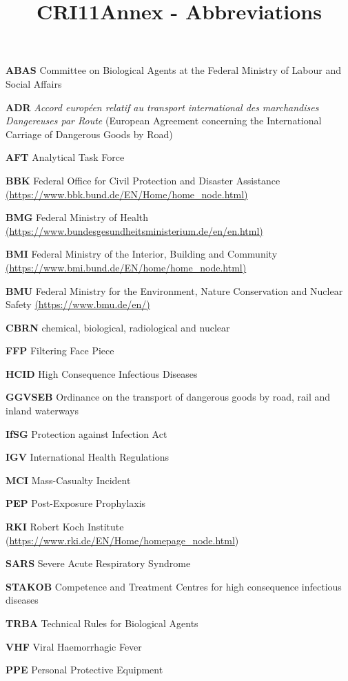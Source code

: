 \documentclass{article}
\begin{document}
\title{CRI11Annex - Abbreviations}

\maketitle





\textbf{ABAS }Committee on Biological Agents at the Federal Ministry of Labour and Social Affairs


\textbf{ADR }\emph{Accord européen relatif au transport international des}\emph{\textbf{ }}\emph{marchandises Dangereuses par Route} (European Agreement concerning the International Carriage of Dangerous Goods by Road)


\textbf{AFT }Analytical Task Force


\textbf{BBK }Federal Office for Civil Protection and Disaster Assistance\textbf{ }\href{https://www.bbk.bund.de/EN/Home/home_node.html}{(https://www.bbk.bund.de/EN/Home/home\_node.html)}


\textbf{BMG }Federal Ministry of Health\textbf{ }\href{https://www.bundesgesundheitsministerium.de/en/en.html}{(https://www.bundesgesundheitsministerium.de/en/en.html)}


\textbf{BMI }Federal Ministry of the Interior, Building and Community\textbf{ }\href{https://www.bmi.bund.de/EN/home/home_node.html}{(https://www.bmi.bund.de/EN/home/home\_node.html)} 


\textbf{BMU }Federal Ministry for the Environment, Nature Conservation and Nuclear\textbf{ }Safety \href{https://www.bmu.de/en/}{(https://www.bmu.de/en/)}


\textbf{CBRN }chemical, biological, radiological and nuclear


\textbf{FFP }Filtering Face Piece


\textbf{HCID }High Consequence Infectious Diseases \textbf{ }


\textbf{GGVSEB }Ordinance on the transport of dangerous goods by road, rail and inland waterways


\textbf{IfSG }Protection against Infection Act


\textbf{IGV }International Health Regulations


\textbf{MCI }Mass-Casualty Incident


\textbf{PEP }Post-Exposure Prophylaxis


\textbf{RKI }Robert Koch Institute (\href{https://www.rki.de/EN/Home/homepage_node.html}{https://www.rki.de/EN/Home/homepage\_node.html})


\textbf{SARS} Severe Acute Respiratory Syndrome


\textbf{STAKOB }Competence and Treatment Centres for high consequence infectious diseases


\textbf{TRBA }Technical Rules for Biological Agents


\textbf{VHF }Viral Haemorrhagic Fever


\textbf{PPE }Personal Protective Equipment
\end{document}
